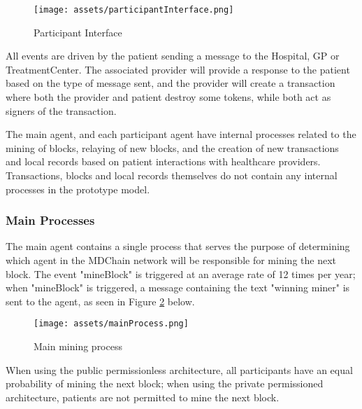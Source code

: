 \documentclass[12pt]{report}
\begin{document}
\begin{figure}[!h]
\texttt{[image: assets/participantInterface.png]}
\caption{Participant Interface}
\label{fig:parLay}
\end{figure}

All events are driven by the patient sending a message to the Hospital, GP or TreatmentCenter. The associated provider will provide a response to the patient based on the type of message sent, and the provider will create a transaction where both the provider and patient destroy some tokens, while both act as signers of the transaction.

The main agent, and each participant agent have internal processes related to the mining of blocks, relaying of new blocks, and the creation of new transactions and local records based on patient interactions with healthcare providers. Transactions, blocks and local records themselves do not contain any internal processes in the prototype model.

\subsubsection{Main Processes}
The main agent contains a single process that serves the purpose of determining which agent in the MDChain network will be responsible for mining the next block. The event "mineBlock" is triggered at an average rate of 12 times per year; when "mineBlock" is triggered, a message containing the text "winning miner" is sent to the agent, as seen in Figure \ref{fig:mainProcess} below.

\begin{figure}[!h]
\begin{center}
\texttt{[image: assets/mainProcess.png]}
\end{center}
\caption{Main mining process}
\label{fig:mainProcess}
\end{figure}

When using the public permissionless architecture, all participants have an equal probability of mining the next block; when using the private permissioned architecture, patients are not permitted to mine the next block.
\end{document}
